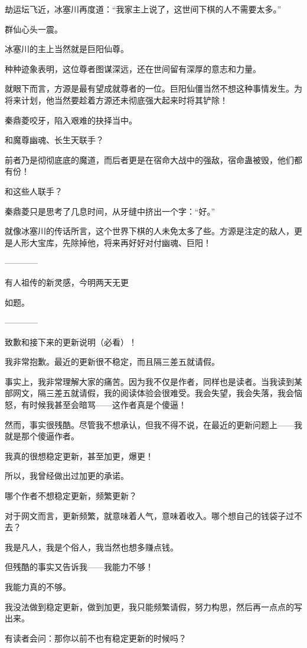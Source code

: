 \begin{this_body}
劫运坛飞近，冰塞川再度道：“我家主上说了，这世间下棋的人不需要太多。”

群仙心头一震。

冰塞川的主上当然就是巨阳仙尊。

种种迹象表明，这位尊者图谋深远，还在世间留有深厚的意志和力量。

就眼下而言，方源是最有望成就尊者的一位。巨阳仙僵当然不想这种事情发生。为将来计划，他当然要趁着方源还未彻底强大起来时将其铲除！

秦鼎菱咬牙，陷入艰难的抉择当中。

和魔尊幽魂、长生天联手？

前者乃是彻彻底底的魔道，而后者更是在宿命大战中的强敌，宿命蛊被毁，他们都有份！

和这些人联手？

秦鼎菱只是思考了几息时间，从牙缝中挤出一个字：“好。”

就像冰塞川的传话所言，这个世界下棋的人未免太多了些。方源是注定的敌人，更是人形大宝库，先除掉他，将来再好好对付幽魂、巨阳！

------------

有人祖传的新灵感，今明两天无更

如题。

------------

致歉和接下来的更新说明（必看）！

我非常抱歉。最近的更新很不稳定，而且隔三差五就请假。

事实上，我非常理解大家的痛苦。因为我不仅是作者，同样也是读者。当我读到某部网文，隔三差五就请假，我的阅读体验会很难受。我会失望，我会失落，我会恼怒，有时候我甚至会暗骂——这作者真是个傻逼！

然而，事实很残酷。尽管我不想承认，但我不得不说，在最近的更新问题上——我就是那个傻逼作者。

我真的很想稳定更新，甚至加更，爆更！

所以，我曾经做出过加更的承诺。

哪个作者不想稳定更新，频繁更新？

对于网文而言，更新频繁，就意味着人气，意味着收入。哪个想自己的钱袋子过不去？

我是凡人，我是个俗人，我当然也想多赚点钱。

但残酷的事实又告诉我——我能力不够！

我能力真的不够。

我没法做到稳定更新，做到加更，我只能频繁请假，努力构思，然后再一点点的写出来。

有读者会问：那你以前不也有稳定更新的时候吗？


\end{this_body}
